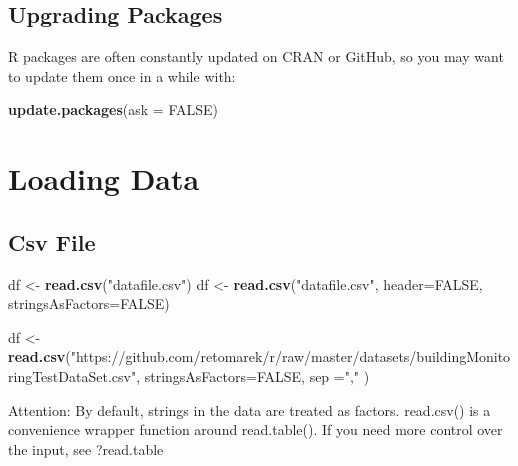 \documentclass[
]{book}
\newenvironment{Shaded}{\begin{snugshade}}{\end{snugshade}}
\newcommand{\DataTypeTok}[1]{\textcolor[rgb]{0.13,0.29,0.53}{#1}}
\newcommand{\KeywordTok}[1]{\textcolor[rgb]{0.13,0.29,0.53}{\textbf{#1}}}
\newcommand{\NormalTok}[1]{#1}
\newcommand{\OtherTok}[1]{\textcolor[rgb]{0.56,0.35,0.01}{#1}}
\newcommand{\StringTok}[1]{\textcolor[rgb]{0.31,0.60,0.02}{#1}}
\begin{document}
\hypertarget{upgrading-packages}{%
\subsection{Upgrading Packages}\label{upgrading-packages}}

R packages are often constantly updated on CRAN or GitHub, so you may want to update them once in a while with:

\begin{Shaded}
\begin{Highlighting}[]
\KeywordTok{update.packages}\NormalTok{(}\DataTypeTok{ask =} \OtherTok{FALSE}\NormalTok{)}
\end{Highlighting}
\end{Shaded}

\hypertarget{loading-data}{%
\section{Loading Data}\label{loading-data}}

\hypertarget{csv-file}{%
\subsection{Csv File}\label{csv-file}}

\begin{Shaded}
\begin{Highlighting}[]
\NormalTok{df <-}\StringTok{ }\KeywordTok{read.csv}\NormalTok{(}\StringTok{"datafile.csv"}\NormalTok{)}
\NormalTok{df <-}\StringTok{ }\KeywordTok{read.csv}\NormalTok{(}\StringTok{"datafile.csv"}\NormalTok{, }\DataTypeTok{header=}\OtherTok{FALSE}\NormalTok{, }\DataTypeTok{stringsAsFactors=}\OtherTok{FALSE}\NormalTok{)}
\end{Highlighting}
\end{Shaded}

\begin{Shaded}
\begin{Highlighting}[]
\NormalTok{df <-}\StringTok{ }\KeywordTok{read.csv}\NormalTok{(}\StringTok{"https://github.com/retomarek/r/raw/master/datasets/buildingMonitoringTestDataSet.csv"}\NormalTok{, }\DataTypeTok{stringsAsFactors=}\OtherTok{FALSE}\NormalTok{, }\DataTypeTok{sep =}\StringTok{","}\NormalTok{ )}
\end{Highlighting}
\end{Shaded}

Attention: By default, strings in the data are treated as factors.
read.csv() is a convenience wrapper function around read.table(). If you need more control over the input, see ?read.table
\end{document}
